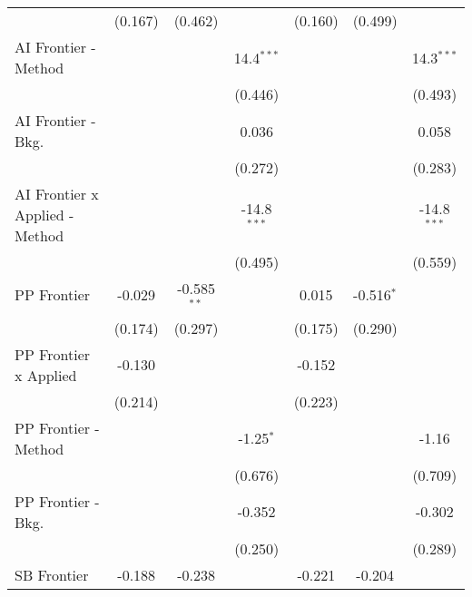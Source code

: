 \begin{tabular}{lcccccc}
                                  & (0.167)       & (0.462)        &               & (0.160)      & (0.499)        &   \\   
   AI Frontier - Method           &               &                & 14.4$^{***}$  &              &                & 14.3$^{***}$\\   
                                  &               &                & (0.446)       &              &                & (0.493)\\   
   AI Frontier - Bkg.             &               &                & 0.036         &              &                & 0.058\\   
                                  &               &                & (0.272)       &              &                & (0.283)\\   
   AI Frontier x Applied - Method &               &                & -14.8$^{***}$ &              &                & -14.8$^{***}$\\   
                                  &               &                & (0.495)       &              &                & (0.559)\\   
   PP Frontier                    & -0.029        & -0.585$^{**}$  &               & 0.015        & -0.516$^{*}$   &   \\   
                                  & (0.174)       & (0.297)        &               & (0.175)      & (0.290)        &   \\   
   PP Frontier x Applied          & -0.130        &                &               & -0.152       &                &   \\   
                                  & (0.214)       &                &               & (0.223)      &                &   \\   
   PP Frontier - Method           &               &                & -1.25$^{*}$   &              &                & -1.16\\   
                                  &               &                & (0.676)       &              &                & (0.709)\\   
   PP Frontier - Bkg.             &               &                & -0.352        &              &                & -0.302\\   
                                  &               &                & (0.250)       &              &                & (0.289)\\   
   SB Frontier                    & -0.188        & -0.238         &               & -0.221       & -0.204         &   \\   

\end{tabular}
